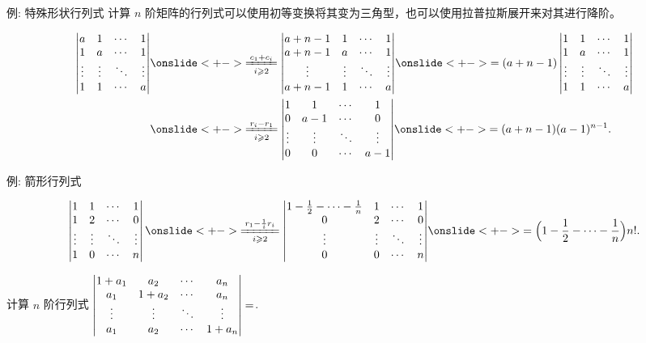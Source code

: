 \begin{frame}{例: 特殊形状行列式}
	\onslide<+->
	计算 $n$ 阶矩阵的行列式可以使用初等变换将其变为三角型，也可以使用拉普拉斯展开来对其进行降阶。
	\onslide<+->
	\begin{example}
		\begin{align*}
			\detm{
			a&1&\cdots&1\\
			1&a&\cdots&1\\
			\vdots&\vdots&\ddots&\vdots\\
			1&1&\cdots&a
		}
		&\onslide<+->{\xeq[i\ge2]{c_1+c_i}\detm{
			a+n-1&1&\cdots&1\\
			a+n-1&a&\cdots&1\\
			\vdots&\vdots&\ddots&\vdots\\
			a+n-1&1&\cdots&a
		}}
		\onslide<+->{=(a+n-1)\detm{
			1&1&\cdots&1\\
			1&a&\cdots&1\\
			\vdots&\vdots&\ddots&\vdots\\
			1&1&\cdots&a
		}}\\
		&\onslide<+->{\xeq[i\ge2]{r_i-r_1}\detm{
			1&1&\cdots&1\\
			0&a-1&\cdots&0\\
			\vdots&\vdots&\ddots&\vdots\\
			0&0&\cdots&a-1
		}}
		\onslide<+->{=(a+n-1)(a-1)^{n-1}.}
		\end{align*}
	\end{example}
\end{frame}


\begin{frame}{例: 箭形行列式}
	\onslide<+->
	\begin{example}
		\[\detm{
			1&1&\cdots&1\\
			1&2&\cdots&0\\
			\vdots&\vdots&\ddots&\vdots\\
			1&0&\cdots&n
		}\onslide<+->{\xeq[i\ge 2]{r_1-\frac1i r_i}
		\detm{
			1-\frac12-\cdots-\frac1n&1&\cdots&1\\
			0&2&\cdots&0\\
			\vdots&\vdots&\ddots&\vdots\\
			0&0&\cdots&n
		}}
		\onslide<+->{=\Bigl(1-\frac12-\cdots-\frac1n\Bigr)n!.}\]
	\end{example}
	\onslide<+->
	\begin{exercise}
		计算 $n$ 阶行列式 $\left|\begin{matrix}
			1+a_1&a_2&\cdots&a_n\\
			a_1&1+a_2&\cdots&a_n\\
			\vdots&\vdots&\ddots&\vdots\\
			a_1&a_2&\cdots&1+a_n
		\end{matrix}\right|=$.
	\end{exercise}
\end{frame}


